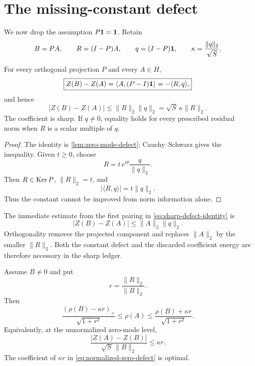 \section{The missing-constant defect}
\label{sec:constant-defect}

We now drop the assumption \(P\mathbf 1=\mathbf 1\).  Retain
\[
 B=PA,\qquad R=(I-P)A,\qquad
 q=(I-P)\mathbf 1,\qquad
 \kappa=\frac{\|q\|_2}{\sqrt S}.
\]

\begin{theorem}
\label{thm:sharp-zero-defect}
For every orthogonal projection \(P\) and every \(A\in H\),
\begin{equation}
 \boxed{
 Z(B)-Z(A)
 =
 \langle A,(P-I)\mathbf 1\rangle
 =
 -\langle R,q\rangle,}
\label{eq:sharp-defect-identity}
\end{equation}
and hence
\begin{equation}
 \boxed{
 |Z(B)-Z(A)|
 \le
 \|R\|_2\|q\|_2
 =
 \sqrt S\,\kappa\|R\|_2.}
\label{eq:sharp-defect-bound}
\end{equation}
The coefficient is sharp.  If \(q\ne0\), equality holds for every
prescribed residual norm when \(R\) is a scalar multiple of \(q\).
\end{theorem}

\begin{proof}
The identity is \cref{lem:zero-mode-defect}; Cauchy--Schwarz gives
the inequality.  Given \(t\ge0\), choose
\[
 R=t\,e^{i\theta}\frac{q}{\|q\|_2}.
\]
Then \(R\in\operatorname{Ker} P\), \(\|R\|_2=t\), and
\[
 |\langle R,q\rangle|
 =t\|q\|_2.
\]
Thus the constant cannot be improved from norm information alone.
\end{proof}

\begin{remark}
\label{rem:residual-not-full}
The immediate estimate from the first pairing in
\eqref{eq:sharp-defect-identity} is
\[
 |Z(B)-Z(A)|
 \le\|A\|_2\|q\|_2.
\]
Orthogonality removes the projected component and replaces
\(\|A\|_2\) by the smaller \(\|R\|_2\).  Both the constant defect
and the discarded coefficient energy are therefore necessary in
the sharp ledger.
\end{remark}

\begin{theorem}
\label{thm:defective-envelope}
Assume \(B\ne0\) and put
\[
 r=\frac{\|R\|_2}{\|B\|_2}.
\]
Then
\begin{equation}
 \boxed{
 \frac{(\rho(B)-\kappa r)_+}{\sqrt{1+r^2}}
 \le\rho(A)\le
 \frac{\rho(B)+\kappa r}{\sqrt{1+r^2}}.}
\label{eq:defective-rho-envelope}
\end{equation}
Equivalently, at the unnormalized zero-mode level,
\begin{equation}
 \boxed{
 \frac{|Z(A)-Z(B)|}{\sqrt S\,\|B\|_2}
 \le\kappa r.}
\label{eq:normalized-zero-defect}
\end{equation}
The coefficient of \(\kappa r\) in
\eqref{eq:normalized-zero-defect} is optimal.
\end{theorem}

